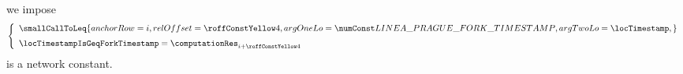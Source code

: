 \item[\underline{\underline{Comparing the timestamp to the \lineaPragueForkTimestamp{}:}}]
	we impose
	\[
		\left\{ \begin{array}{l}
			\smallCallToLeq {
				anchorRow = i                                       ,
				relOffset = \TNTFtimestampToForkTimestampComparison ,
				argOneLo  = \lineaPragueForkTimestamp               ,
				argTwoLo  = \locTimestamp                           ,
			}
			\vspace{2mm} \\
			\locTimestampIsGeqForkTimestamp = \computationRes _{i + \TNTFtimestampToForkTimestampComparison} \\
		\end{array} \right.
	\]
	\saNote{}
	\lineaPragueForkTimestamp{}
	is a network constant.
